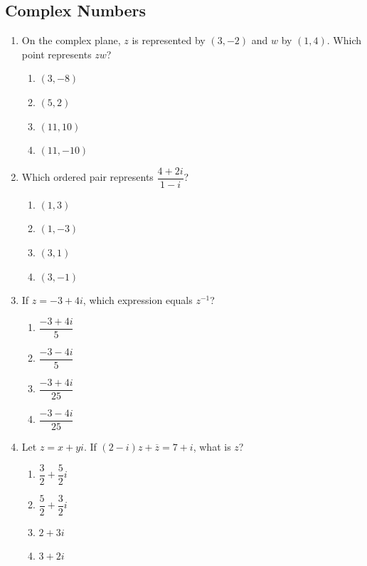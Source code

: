 \documentclass[12pt]{article}
\begin{document}
\subsection*{Complex Numbers}
\begin{enumerate}[leftmargin=*,itemsep=1em,resume]
  \item On the complex plane, $z$ is represented by $(3,-2)$ and $w$ by $(1,4)$. Which point represents $zw$?
  \begin{enumerate}[label=\Alph*.,itemsep=0pt]
    \item $(3,-8)$ \item $(5,2)$ \item $(11,10)$ \item $(11,-10)$
  \end{enumerate}

  \item Which ordered pair represents $\dfrac{4+2i}{1-i}$?
  \begin{enumerate}[label=\Alph*.,itemsep=0pt]
    \item $(1,3)$ \item $(1,-3)$ \item $(3,1)$ \item $(3,-1)$
  \end{enumerate}

  \item If $z=-3+4i$, which expression equals $z^{-1}$?
  \begin{enumerate}[label=\Alph*.,itemsep=0pt]
    \item $\dfrac{-3+4i}{5}$ \item $\dfrac{-3-4i}{5}$
    \item $\dfrac{-3+4i}{25}$ \item $\dfrac{-3-4i}{25}$
  \end{enumerate}

  \item Let $z=x+yi$. If $(2-i)z+\overline z=7+i$, what is $z$?
  \begin{enumerate}[label=\Alph*.,itemsep=0pt]
    \item $\dfrac32+\dfrac52i$ \item $\dfrac52+\dfrac32i$
    \item $2+3i$ \item $3+2i$
  \end{enumerate}
\end{enumerate}
\end{document}

